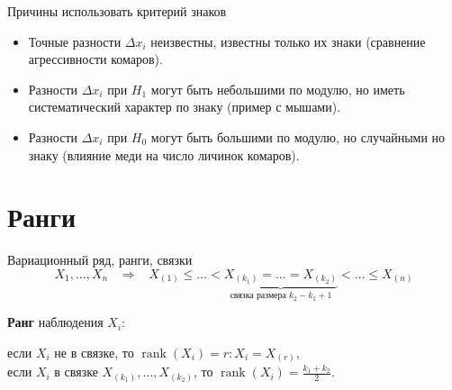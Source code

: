 \documentclass[9pt,pdf,utf8,hyperref={unicode},aspectratio=169]{beamer}
\DeclareMathOperator{\rank}{rank}
\begin{document}
\begin{frame}{Причины использовать критерий знаков}
 \begin{itemize}
     \item Точные разности $\Delta x_i$ неизвестны, известны только их знаки (сравнение агрессивности комаров).    	
     \bigskip
     \item Разности $\Delta x_i$ при $H_1$ могут быть небольшими по модулю, но иметь систематический характер по знаку (пример с мышами).
     \bigskip
     \item Разности $\Delta x_i$ при $H_0$ могут быть большими по модулю, но случайными но знаку (влияние меди на число личинок комаров).
     \bigskip
 \end{itemize}
\end{frame}



\section{Ранги}
\begin{frame}{Вариационный ряд, ранги, связки}
 $$X_1,\ldots,X_n \;\;\; \Rightarrow \;\;\; X_{(1)}\leq\ldots < \underbrace{X_{(k_1)} = \ldots = X_{(k_2)}}_{\text{связка размера } k_2-k_1+1}<\ldots\leq X_{(n)}$$

 \bigskip

 \textbf{Ранг} наблюдения $X_i$:

 если $X_i$ не в связке, то $\rank\left(X_i\right)=r\colon X_i=X_{(r)}$, \\
 если $X_i$ в связке $X_{(k_1)}, \ldots, X_{(k_2)}$, то $\rank\left(X_i\right)=\frac{k_1+k_2}{2}.$
\end{frame}
\end{document}
